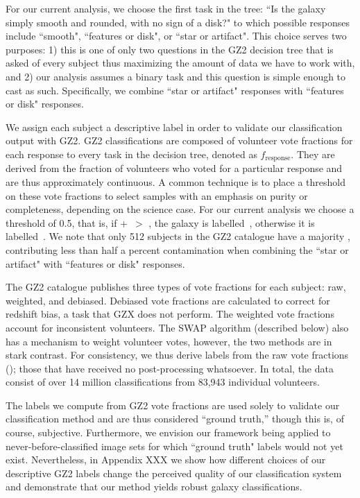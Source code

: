 For our current analysis, we choose the first task in the tree: ``Is the galaxy simply smooth and rounded, with no sign of a disk?" to which possible responses include ``smooth", ``features or disk", or ``star or artifact". This choice serves two purposes: 1) this is one of only two questions in the GZ2 decision tree that is asked of every subject thus maximizing the amount of data we have to work with, and 2) our analysis assumes a binary task and this question is simple enough to cast as such. Specifically, we combine ``star or artifact" responses with ``features or disk" responses.

We assign each subject a descriptive label in order to validate our classification output with GZ2. GZ2 classifications are composed of volunteer vote fractions for each response to every task in the decision tree, denoted as $f_{\mathrm{response}}$. They are derived from the fraction of volunteers who voted for a particular response and are thus approximately continuous. A common technique is to place a threshold on these vote fractions to select samples with an emphasis on purity or completeness, depending on the science case. For our current analysis we choose a threshold of 0.5, that is, if \ffeat+\fstar~$ >$ \fsmooth, the galaxy is labelled~\feat, otherwise it is labelled~\notfeat. We note that only 512 subjects in the GZ2 catalogue have a majority \fstar, contributing less than half a percent contamination when combining the ``star or artifact" with ``features or disk" responses.

The GZ2 catalogue publishes three types of vote fractions for each subject: raw, weighted, and debiased. Debiased vote fractions are calculated to correct for redshift bias, a task that GZX does not perform. The weighted vote fractions account for inconsistent volunteers. The SWAP algorithm (described below) also has a mechanism to weight volunteer votes, however, the two methods are in stark contrast. For consistency, we thus derive labels from the raw vote fractions (\raw); those that have received no post-processing whatsoever. In total, the data consist of over 14 million classifications from 83,943 individual volunteers. 

The labels we compute from GZ2 vote fractions are used solely to validate our classification method and are thus considered ``ground truth,'' though this is, of course, subjective. Furthermore, we envision our framework being applied to never-before-classified image sets for which ``ground truth" labels would not yet exist. Nevertheless, in Appendix XXX we show how different choices of our descriptive GZ2 labels change the perceived quality of our classification system and demonstrate that our method yields robust galaxy classifications.


